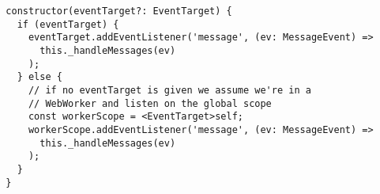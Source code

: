 \begin{verbatim}
  constructor(eventTarget?: EventTarget) {
    if (eventTarget) {
      eventTarget.addEventListener('message', (ev: MessageEvent) =>
        this._handleMessages(ev)
      );
    } else {
      // if no eventTarget is given we assume we're in a
      // WebWorker and listen on the global scope
      const workerScope = <EventTarget>self;
      workerScope.addEventListener('message', (ev: MessageEvent) =>
        this._handleMessages(ev)
      );
    }
  }
\end{verbatim}
